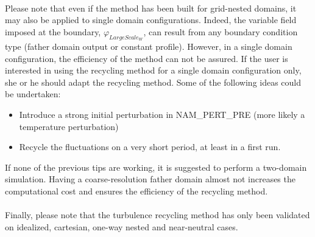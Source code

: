 \\Please note that even if the method has been built for grid-nested domains, it may also be applied to single domain configurations. Indeed, the variable field imposed at the boundary, $\varphi_{LargeScale_W}$, can result from any boundary condition type (father domain output or constant profile). However, in a single domain configuration, the efficiency of the method can not be assured. If the user is interested in using the recycling method for a single domain configuration only, she or he should adapt the recycling method. Some of the following ideas could be undertaken:
\begin{itemize}
 \item Introduce a strong initial perturbation in NAM\_PERT\_PRE (more likely a temperature perturbation)
 \item Recycle the fluctuations on a very short period, at least in a first run.
\end{itemize}
If none of the previous tips are working, it is suggested to perform a two-domain simulation. Having a coarse-resolution father domain almost not increases the computational cost and ensures the efficiency of the recycling method.
\\
\\Finally, please note that the turbulence recycling method has only been validated on idealized, cartesian, one-way nested and near-neutral cases.



